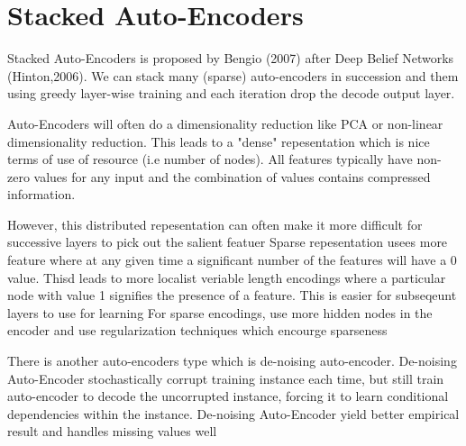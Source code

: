 \documentclass[12pt, a4paper, twoside]{book}
\begin{document}
\section{Stacked Auto-Encoders}

Stacked Auto-Encoders is proposed by Bengio (2007) after Deep Belief Networks (Hinton,2006). We can stack many (sparse) auto-encoders in succession and them using greedy layer-wise training and each iteration drop the decode output layer.

Auto-Encoders will often do a dimensionality reduction like PCA or non-linear dimensionality reduction.
This leads to a "dense" repesentation which is nice terms of use of resource (i.e number of nodes). All features
typically have non-zero values for any input and the combination of values contains compressed information.

However, this distributed repesentation can often make it more difficult for successive layers to pick out the salient featuer
Sparse repesentation usees more feature where at any given time a significant number of the features will have a 0 value.
Thisd leads to more localist veriable length encodings where a particular node with value 1 signifies the presence of a feature.
This is easier for subseqeunt layers to use for learning
For sparse encodings, use more hidden nodes in the encoder and use regularization techniques which encourge sparseness

There is another auto-encoders type which is de-noising auto-encoder. De-noising Auto-Encoder stochastically corrupt training instance each time, but still train auto-encoder to decode the uncorrupted instance, forcing it to learn conditional dependencies within the instance.
De-noising Auto-Encoder yield better empirical result and handles missing values well
\end{document}

